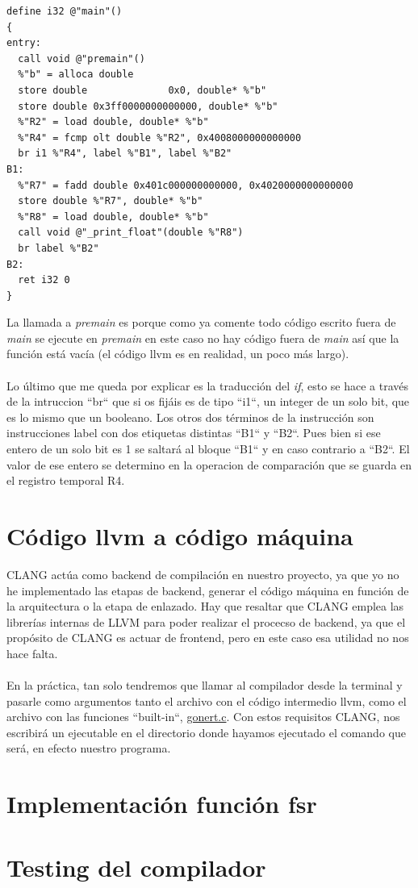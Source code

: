 \begin{lstlisting}[style=pythonStyle]
define i32 @"main"()
{
entry:
  call void @"premain"()
  %"b" = alloca double
  store double              0x0, double* %"b"
  store double 0x3ff0000000000000, double* %"b"
  %"R2" = load double, double* %"b"
  %"R4" = fcmp olt double %"R2", 0x4008000000000000
  br i1 %"R4", label %"B1", label %"B2"
B1:
  %"R7" = fadd double 0x401c000000000000, 0x4020000000000000
  store double %"R7", double* %"b"
  %"R8" = load double, double* %"b"
  call void @"_print_float"(double %"R8")
  br label %"B2"
B2:
  ret i32 0
}
\end{lstlisting}
La llamada a \textit{premain} es porque como ya comente todo código escrito fuera de \textit{main} se ejecute en \textit{premain} en este caso no hay código fuera de \textit{main} así que la función está vacía (el código llvm es en realidad, un poco más largo). \\\\
Lo último que me queda por explicar es la traducción del \textit{if}, esto se hace a través de la intruccion ``br`` que si os fijáis es de tipo ``i1``, un integer de un solo bit, que es lo mismo que un booleano. Los otros dos términos de la instrucción son instrucciones label con dos etiquetas distintas ``B1`` y ``B2``. Pues bien si ese entero de un solo bit es 1 se saltará al bloque ``B1`` y en caso contrario a ``B2``. El valor de ese entero se determino en la operacion de comparación que se guarda en el registro temporal R4.

\section{Código llvm a código máquina}
CLANG actúa como backend de compilación en nuestro proyecto, ya que yo no he implementado las etapas de backend, generar el código máquina en función de la arquitectura o la etapa de enlazado. Hay que resaltar que CLANG emplea las librerías internas de LLVM para poder realizar el procecso de backend, ya que el propósito de CLANG es actuar de frontend, pero en este caso esa utilidad no nos hace falta. \\\\
En la práctica, tan solo tendremos que llamar al compilador desde la terminal y pasarle como argumentos tanto el archivo con el código intermedio llvm, como el archivo con las funciones ``built-in``, \href{https://github.com/domingoUnican/TFGPedroCastro/blob/main/code/compilerGoneFSR/gone/gonert.c}{gonert.c}. Con estos requisitos CLANG, nos escribirá un ejecutable en el directorio donde hayamos ejecutado el comando que será, en efecto nuestro programa.
\section{Implementación función fsr}

\section{Testing del compilador}


